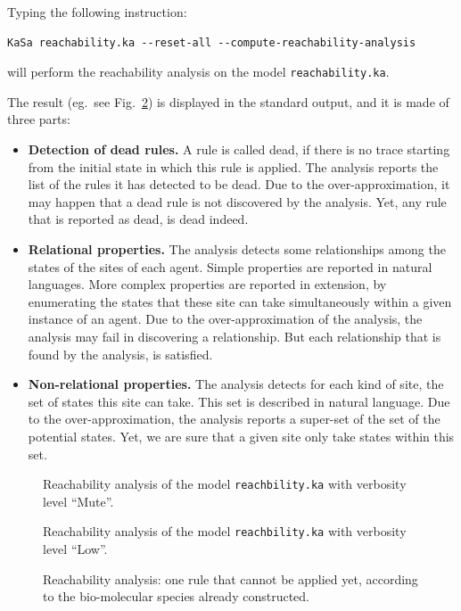 \documentclass[11pt]{book}
\begin{document}
Typing the following instruction:
\begin{verbatim}
KaSa reachability.ka --reset-all --compute-reachability-analysis
\end{verbatim}

will perform the reachability analysis on the model \texttt{reachability.ka}. 


The result (eg.~see Fig.~\ref{fig:reachability_low}) is displayed in the standard output, and it is made of three parts:
\begin{itemize}
\item \textbf{Detection of dead rules.} A rule is called dead, if there is no trace starting from the initial state in which this rule is applied. The analysis reports the list of the rules it has detected to be dead. Due to the over-approximation, it may happen that a dead rule is not discovered by the analysis. Yet, any rule that is reported as dead, is dead indeed. 
  
\item \textbf{Relational properties.} The analysis detects some relationships among the states of the sites of each agent. Simple properties are reported in natural languages. More complex properties are reported in extension, by enumerating the states that these site can take simultaneously within a given instance of an agent. Due to the over-approximation of the analysis, the analysis may fail in discovering a relationship. But each relationship that is found by the analysis, is satisfied. 

\item \textbf{Non-relational properties.} The analysis detects for each kind of site, the set of states this site can take. This set is described in natural language. Due to the over-approximation, the analysis reports a super-set of the set of the potential states. Yet, we are sure that a given site only take states within this set. 
\end{itemize}

\begin{figure}[t]

\caption{Reachability analysis of the model \texttt{reachbility.ka} with verbosity level ``Mute''.}
\label{fig:reachability_mute}
\end{figure}
\begin{figure}[p]

\caption{Reachability analysis of the model \texttt{reachbility.ka} with verbosity level ``Low''.}
\label{fig:reachability_low}
\end{figure}
\begin{figure}[p]

\caption{Reachability analysis: one rule that cannot be applied yet, according to the bio-molecular species already constructed.}
\label{fig:reachability_medium_ko}
\end{figure}
\end{document}

